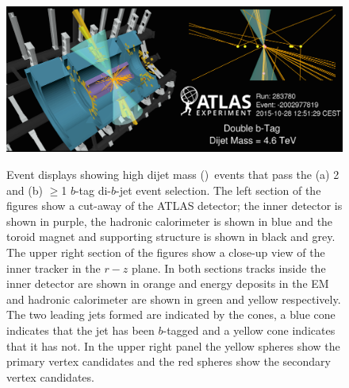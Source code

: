 \begin{figure}[!ht]
  \begin{center}
    \captionsetup[subfigure]{aboveskip=0pt,justification=centering}
          {\includegraphics[width=0.95\linewidth, angle=0]{figs/Dibjet/Gen/evt-vp1_bb.png}}\\
  \end{center}
  \caption
      {Event displays showing high dijet mass (\mjj{})~events that pass the (a) 2 and (b) $\geq$1 $b$-tag di-$b$-jet event selection.
        The left section of the figures show a cut-away of the ATLAS detector;
        the inner detector is shown in purple, the hadronic calorimeter is shown in blue
        and the toroid magnet and supporting structure is shown in black and grey.
        The upper right section of the figures show a close-up view of the inner tracker in the $r-z$ plane.
        In both sections tracks inside the inner detector are shown in orange
        and energy deposits in the EM and hadronic calorimeter are shown in green and yellow respectively.
        The two leading jets formed are indicated by the cones, a blue cone indicates that the jet has been
        $b$-tagged and a yellow cone indicates that it has not.
        In the upper right panel the yellow spheres show the primary vertex candidates and the red spheres show the secondary vertex candidates.
      }
  \label{fig:evt-vp1}
\end{figure}

